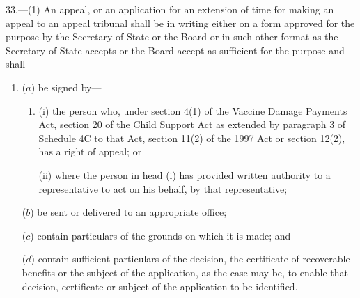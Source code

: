 \documentclass[12pt,a4paper]{article}
\begin{document}
33.—(1) An appeal, or an application for an extension of time for making an appeal to an appeal tribunal shall be in writing either on a form approved for the purpose by the Secretary of State 
or the Board   %
or in such other format as the Secretary of State accepts 
or the Board accept   %
as sufficient for the purpose and shall—
\begin{enumerate}\item[]
($a$) be signed by—
\begin{enumerate}\item[]
(i) the person who, under 
section 4(1) of the Vaccine Damage Payments Act,  %
section 20 of the Child Support Act as extended by paragraph 3 of Schedule 4C to that Act, section 11(2) of the 1997 Act or section 12(2), has a right of appeal; or

(ii) where the person in head (i) has provided written authority to a representative to act on his behalf, by that representative;
\end{enumerate}

($b$) be sent or delivered to an appropriate office;

($c$) contain particulars of the grounds on which it is made; and

($d$) contain sufficient particulars of the decision, the certificate of recoverable benefits or the subject of the application, as the case may be, to enable that decision, certificate or subject of the application to be identified.
\end{enumerate}
\end{document}
